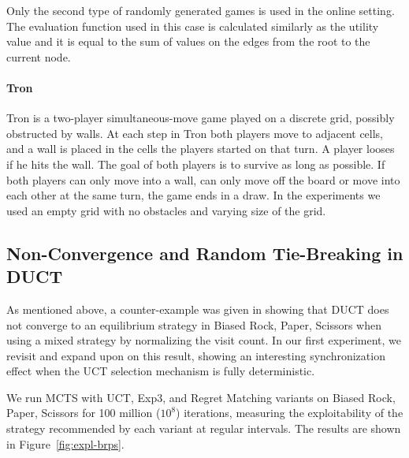 Only the second type of randomly generated games is used in the online setting. 
The evaluation function used in this case is calculated similarly as the utility value and it is equal to the sum of values on the edges from the root to the current node.

\paragraph{\textbf{Tron}} 
Tron is a two-player simultaneous-move game played on a discrete grid, possibly obstructed by walls. 
At each step in Tron both players move to adjacent cells, and a wall is placed in the cells the players started on that turn.
A player looses if he hits the wall.
The goal of both players is to survive as long as possible. 
If both players can only move into a wall, can only move off the board or move into each other at the same turn, the game ends in a draw. 
In the experiments we used an empty grid with no obstacles and varying size of the grid.


\subsection{Non-Convergence and Random Tie-Breaking in DUCT}\label{sec:exp:brps} 
As mentioned above, a counter-example was given in \cite{Shafiei09} showing that 
DUCT does not converge to an equilibrium strategy in Biased Rock, Paper, Scissors 
when using a mixed strategy by normalizing the visit count.
In our first experiment, we revisit and expand upon on this result, showing an interesting 
synchronization effect when the UCT selection mechanism is fully deterministic.

We run MCTS with UCT, Exp3, and Regret Matching variants on Biased Rock, Paper, Scissors
for 100 million ($10^8$) iterations, measuring the exploitability of the strategy recommended by 
each variant at regular intervals. The results are shown in Figure~\ref{fig:expl-brps}.

